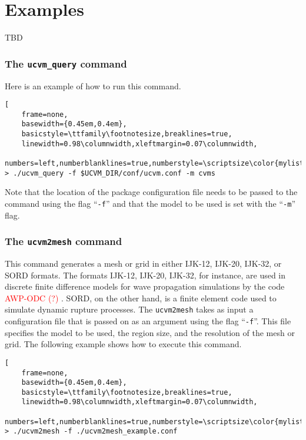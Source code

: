 
\section{Examples}

TBD

\subsubsection{The \textup{\texttt{ucvm\_query}} command}

Here is an example of how to run this command.

\begin{lstlisting}[
	frame=none,
	basewidth={0.45em,0.4em},
	basicstyle=\ttfamily\footnotesize,breaklines=true,
	linewidth=0.98\columnwidth,xleftmargin=0.07\columnwidth,
	numbers=left,numberblanklines=true,numberstyle=\scriptsize\color{mylistingnclr}]
> ./ucvm_query -f $UCVM_DIR/conf/ucvm.conf -m cvms
\end{lstlisting}

Note that the location of the package configuration file needs to be passed to the command using the flag ``\texttt{-f}'' and that the model to be used is set with the ``\texttt{-m}'' flag. 

\subsubsection{The \textup{\texttt{ucvm2mesh}} command}

This command generates a mesh or grid in either IJK-12, IJK-20, IJK-32, or SORD formats. The formats IJK-12, IJK-20, IJK-32, for instance, are used in discrete finite difference models for wave propagation simulations by the code \textcolor{red}{AWP-ODC (?) \citep{Cui_2010_Proc}}. SORD, on the other hand, is a finite element code used to simulate dynamic rupture processes. The \texttt{ucvm2mesh} takes as input a configuration file that is passed on as an argument using the flag ``\texttt{-f}''. This file specifies the model to be used, the region size, and the resolution of the mesh or grid. The following example shows how to execute this command.

\begin{lstlisting}[
	frame=none,
	basewidth={0.45em,0.4em},
	basicstyle=\ttfamily\footnotesize,breaklines=true,
	linewidth=0.98\columnwidth,xleftmargin=0.07\columnwidth,
	numbers=left,numberblanklines=true,numberstyle=\scriptsize\color{mylistingnclr}]
> ./ucvm2mesh -f ./ucvm2mesh_example.conf
\end{lstlisting}

